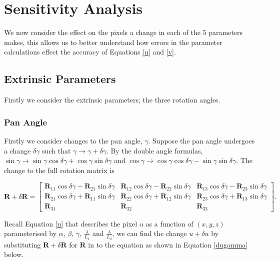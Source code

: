 \documentclass[12pt]{article}
\newcommand{\mtx}[1]{\ensuremath{\mathbf{#1}}}
\begin{document}
\section{Sensitivity Analysis}

We now consider the effect on the pixels a change in each of the 5 parameters makes, this allows us to better understand how errors in the parameter calculations effect the accuracy of Equations \ref{u} and \ref{v}.

\subsection{Extrinsic Parameters}
Firstly we consider the extrinsic parameters; the three rotation angles.

\subsubsection{Pan Angle}
Firstly we consider changes to the pan angle, $\gamma$. Suppose the pan angle undergoes a change $\delta\gamma$ such that $\gamma \rightarrow \gamma + \delta\gamma$. By the double angle formulas, $\sin\gamma\rightarrow\sin\gamma\cos\delta\gamma + \cos\gamma\sin\delta\gamma$ and $\cos\gamma\rightarrow\cos\gamma\cos\delta\gamma - \sin\gamma\sin\delta\gamma$. The change to the full rotation matrix is

\begin{equation}
 \mtx{R} + \delta\mtx{R} =
  \begin{bmatrix}
    \mtx{R}_{11}\cos\delta\gamma - \mtx{R}_{21}\sin\delta\gamma & \mtx{R}_{12}\cos\delta\gamma - \mtx{R}_{22}\sin\delta\gamma & \mtx{R}_{13}\cos\delta\gamma - \mtx{R}_{23}\sin\delta\gamma \\

    \mtx{R}_{21}\cos\delta\gamma + \mtx{R}_{11}\sin\delta\gamma & \mtx{R}_{22}\cos\delta\gamma + \mtx{R}_{12}\sin\delta\gamma & \mtx{R}_{23}\cos\delta\gamma + \mtx{R}_{13}\sin\delta\gamma \\

    \mtx{R}_{31} & \mtx{R}_{32} & \mtx{R}_{33}
 \end{bmatrix}.
\end{equation}

Recall Equation \ref{u} that describes the pixel $u$ as a function of $(x,y,z)$ parameterised by $\alpha$, $\beta$, $\gamma$, $\frac{\lambda}{L_1}$ and $\frac{\lambda}{L_2}$, we can find the change $u + \delta u$ by substituting $\mtx{R} + \delta\mtx{R}$ for $\mtx{R}$ in to the equation as shown in Equation \ref{dugamma} below.
\end{document}
